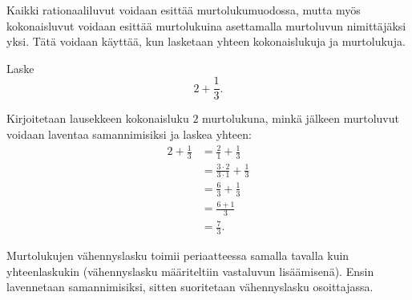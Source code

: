 Kaikki rationaaliluvut voidaan esittää murtolukumuodossa, mutta myös kokonaisluvut voidaan esittää murtolukuina asettamalla murtoluvun nimittäjäksi yksi. Tätä voidaan käyttää, kun lasketaan yhteen kokonaislukuja ja murtolukuja.
    
    \begin{esimerkki}
        Laske\[ 2 + \frac{1}{3}.\]
                \begin{esimratk}
        Kirjoitetaan lausekkeen kokonaisluku $2$ murtolukuna, minkä jälkeen murtoluvut voidaan laventaa samannimisiksi ja laskea yhteen:
        \begin{align*}
           2 + \frac{1}{3} &= \frac{2}{1} + \frac{1}{3}  \\ 
	   &= \frac{3 \cdot 2}{3 \cdot 1} + \frac{1}{3} \\ 
	    &= \frac{6}{3} + \frac{1}{3} \\ 
	   &= \frac{6+1}{3} \\ 
	   &= \frac{7}{3}.
        \end{align*}
                \end{esimratk}
    \end{esimerkki}
    
Murtolukujen vähennyslasku toimii periaatteessa samalla tavalla kuin yhteenlaskukin (vähennyslasku määriteltiin vastaluvun lisäämisenä). Ensin lavennetaan samannimisiksi, sitten suoritetaan vähennyslasku osoittajassa.

